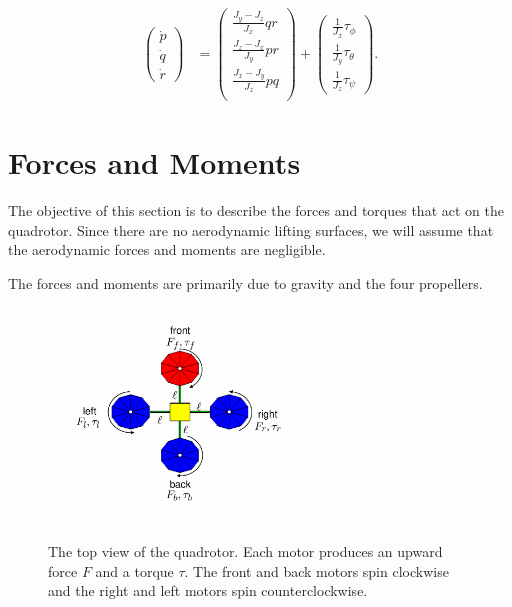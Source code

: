 {\begin{align}
    \label{eq:kin-eom-euler}\\
\begin{pmatrix} \dot{p} \\ \dot{q} \\ \dot{r} \end{pmatrix}
&= \begin{pmatrix}
    \frac{J_y-J_z}{J_x} qr\\
    \frac{J_z-J_x}{J_y} pr\\
    \frac{J_x-J_y}{J_z} pq\\
    \end{pmatrix}
    + \begin{pmatrix}
    \frac{1}{J_x} \tau_{\phi} \\
    \frac{1}{J_y} \tau_{\theta} \\
    \frac{1}{J_z} \tau_{\psi}
    \end{pmatrix}.
    \label{eq:kin-eom-omega}
\end{align}

\section{Forces and Moments} \label{chap:forces}

The objective of this section is to describe the forces and torques
that act on the quadrotor.  Since there are no aerodynamic lifting
surfaces, we will assume that the aerodynamic forces and moments are
negligible.

The forces and moments are primarily due to gravity and the four
propellers.

\begin{figure}[hhhhtb]
  \centering
  \includegraphics[width=0.6\textwidth]{chap3_multirotor/figures/quadrotor_top_view}\\
  \caption{The top view of the quadrotor.  Each motor produces an upward
  force $F$ and a torque $\tau$.  The front and back motors spin clockwise
  and the right and left motors spin counterclockwise.}%
  \label{fig:quadrotor_top_view}
\end{figure}


}
